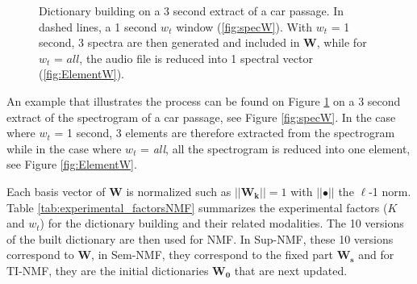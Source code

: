 \documentclass[twocolumn]{svjour3}          %
\begin{document}
\begin{figure}[t]
  \centering
  \caption{Dictionary building on a 3 second extract of a car passage. In dashed lines, a 1 second $w_t$ window  (\ref{fig:specW}). With $w_t$ = 1 second, 3 spectra are then generated and included in $\mathbf{W}$, while for $w_t$ = $all$, the audio file is reduced into 1 spectral vector (\ref{fig:ElementW}).}
  \label{fig:spec_elementW}
\end{figure}


An example that illustrates the process can be found on Figure \ref{fig:spec_elementW} on a 3 second extract of the spectrogram of a car passage, see Figure \ref{fig:specW}. In the case where $w_t$ = 1 second, 3 elements are therefore extracted from the spectrogram while in the case where $w_t$ = \textit{all}, all the spectrogram is reduced into one element, see Figure \ref{fig:ElementW}.

Each basis vector of $\mathbf{W}$ is normalized such as $\vert \vert \mathbf{W_k} \vert \vert = 1$ with $\vert \vert \bullet \vert\vert$ the $\ell$-1 norm. Table \ref{tab:experimental_factorsNMF} summarizes the experimental factors ($K$ and $w_t$) for the dictionary building and their related modalities. The 10 versions of the built dictionary are then used for NMF. In Sup-NMF, these 10 versions correspond to $\mathbf{W}$, in Sem-NMF, they correspond to the fixed part $\mathbf{W_s}$ and for TI-NMF, they are the initial dictionaries $\mathbf{W_0}$ that are next updated.
\end{document}
